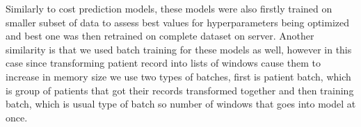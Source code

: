 Similarly to cost prediction models, these models were also firstly trained on smaller subset of data to assess best values for hyperparameters being optimized and best one was then retrained on complete dataset on server. Another similarity is that we used batch training for these models as well, however in this case since transforming patient record into lists of windows cause them to increase in memory size we use two types of batches, first is patient batch, which is group of patients that got their records transformed together and then training batch, which is usual type of batch so number of windows that goes into model at once.  